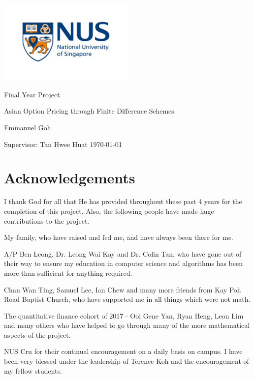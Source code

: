 \documentclass[12pt]{report}
\begin{document}
\begin{titlepage}
  \centering
  \includegraphics[width=0.5\textwidth]{nus}

  \LARGE Final Year Project

  \vspace{1cm}
  \Large Asian Option Pricing through Finite Difference Schemes

  \vspace{1cm}

  \Large Emmanuel Goh

  \vspace{1cm}
  \Large Supervisor: Tan Hwee Huat
  \vfill
  \large \today
\end{titlepage}

\tableofcontents

\newpage

\section*{Acknowledgements}
I thank God for all that He has provided throughout these past 4 years for the completion of this project. Also, the following people have made huge contributions to the project.

My family, who have raised and fed me, and have always been there for me.

A/P Ben Leong, Dr. Leong Wai Kay and Dr. Colin Tan, who have gone out of their way to ensure my education in computer science and algorithms has been more than sufficient for anything required.

Chan Wan Ting, Samuel Lee, Ian Chew and many more friends from Kay Poh Road Baptist Church, who have supported me in all things which were not math.

The quantitative finance cohort of 2017 - Ooi Gene Yan, Ryan Heng, Leon Lim and many others who have helped to go through many of the more mathematical aspects of the project.

NUS Cru for their continual encouragement on a daily basis on campus. I have been very blessed under the leadership of Terence Koh and the encouragement of my fellow students.
\end{document}
